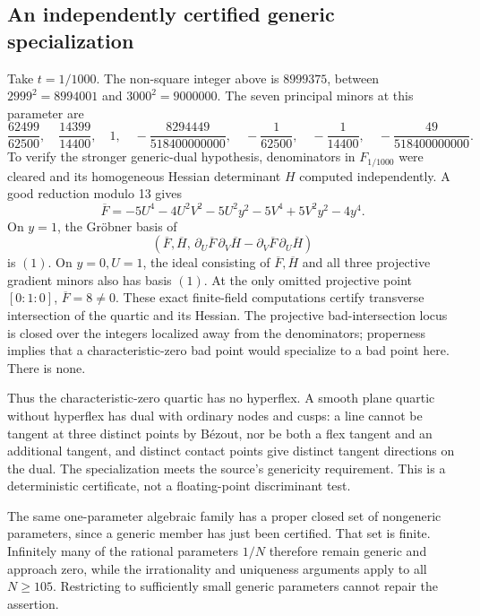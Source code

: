 \documentclass[10pt]{article}
\begin{document}
\subsection*{An independently certified generic specialization}
Take \(t=1/1000\). The non-square integer above is \(8999375\), between \(2999^2=8994001\) and \(3000^2=9000000\). The seven principal minors at this parameter are \[\frac{62499}{62500},\quad \frac{14399}{14400},\quad 1,\quad
 -\frac{8294449}{518400000000},\quad
 -\frac1{62500},\quad-\frac1{14400},\quad
 -\frac{49}{518400000000}.\] To verify the stronger generic-dual hypothesis, denominators in \(F_{1/1000}\) were cleared and its homogeneous Hessian determinant \(H\) computed independently. A good reduction modulo 13 gives \[\overline F=-5U^4-4U^2V^2-5U^2y^2-5V^4+5V^2y^2-4y^4.\] On \(y=1\), the Gröbner basis of \[\left(\overline F,\overline H,\,
 \partial_U\overline F\,\partial_V\overline H-
 \partial_V\overline F\,\partial_U\overline H\right)\] is \((1)\). On \(y=0,U=1\), the ideal consisting of \(\overline F,\overline H\) and all three projective gradient minors also has basis \((1)\). At the only omitted projective point \([0:1:0]\), \(\overline F=8\ne0\). These exact finite-field computations certify transverse intersection of the quartic and its Hessian. The projective bad-intersection locus is closed over the integers localized away from the denominators; properness implies that a characteristic-zero bad point would specialize to a bad point here. There is none.\par
Thus the characteristic-zero quartic has no hyperflex. A smooth plane quartic without hyperflex has dual with ordinary nodes and cusps: a line cannot be tangent at three distinct points by Bézout, nor be both a flex tangent and an additional tangent, and distinct contact points give distinct tangent directions on the dual. The specialization meets the source’s genericity requirement. This is a deterministic certificate, not a floating-point discriminant test.\par
The same one-parameter algebraic family has a proper closed set of nongeneric parameters, since a generic member has just been certified. That set is finite. Infinitely many of the rational parameters \(1/N\) therefore remain generic and approach zero, while the irrationality and uniqueness arguments apply to all \(N\ge105\). Restricting to sufficiently small generic parameters cannot repair the assertion.\par
\end{document}

